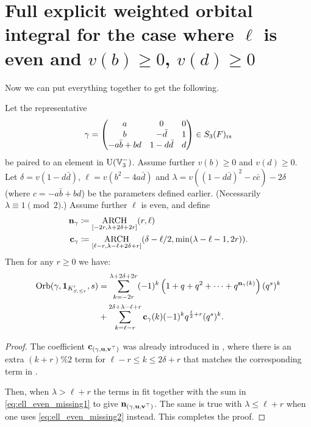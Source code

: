 \section{Full explicit weighted orbital integral for the case where $\ell$ is even and $v(b) \ge 0$, $v(d) \ge 0$}
Now we can put everything together to get the following.
\begin{theorem}
  \label{thm:full_orbital_ell_even}
  Let the representative
  \[ \gamma = \begin{pmatrix}
      a & 0 & 0 \\
      b & - \bar d & 1 \\
      -a \bar b + b d & 1 - d \bar d & d
    \end{pmatrix} \in S_3(F)_{\mathrm{rs}} \]
  be paired to an element in $\operatorname{U}(\mathbb V_3^-)$.
  Assume further $v(b) \ge 0$ and $v(d) \ge 0$.
  Let $\delta = v(1 - d \bar d)$, $\ell = v(b^2 - 4 a \bar d)$ and
  $\lambda = v((1 - d \bar d)^2 - c \bar c) - 2\delta$
  (where $c = -a \bar b + b d $) be the parameters defined earlier.
  (Necessarily $\lambda \equiv 1 \pmod 2$.)
  Assume further $\ell$ is even, and define
  \begin{align*}
    \mathbf n_\gamma &\coloneqq \operatorname*{ARCH}_{[-2r, \lambda + 2\delta + 2r]}(r, \ell) \\
    \mathbf c_\gamma &\coloneqq \operatorname*{ARCH}_{[\ell-r, \lambda - \ell + 2\delta + r]}
    (\delta - \ell/2, \min(\lambda-\ell-1, 2r)).
  \end{align*}
  Then for any $r \ge 0$ we have:
  \begin{align*}
    \operatorname{Orb}(\gamma, \mathbf{1}_{K'_{S, \le r}}, s)
    &= \sum_{k = -2r}^{\lambda + 2\delta +  2r}
    (-1)^k \left( 1 + q + q^2 + \dots + q^{\mathbf n_{\gamma}(k)}  \right) (q^s)^k \\
    &+ \sum_{k = \ell-r}^{2\delta + \lambda - \ell + r} \mathbf c_\gamma(k) (-1)^k q^{\frac{\ell}{2}+r} (q^s)^k.
  \end{align*}
\end{theorem}
\begin{proof}
  The coefficient $\mathbf c_{(\gamma, \mathbf u, \mathbf v^\top)}$ was already introduced in ,
  where there is an extra $(k+r)\%2$ term for $\ell-r \le k \le 2\delta+r$
  that matches the corresponding term in .

  Then, when $\lambda > \ell + r$ the terms in 
  fit together with the sum in \eqref{eq:ell_even_missing1} to give $\mathbf n_{(\gamma, \mathbf u, \mathbf v^\top)}$.
  The same is true with $\lambda \le \ell + r$
  when one uses \eqref{eq:ell_even_missing2} instead.
  This completes the proof.
\end{proof}

